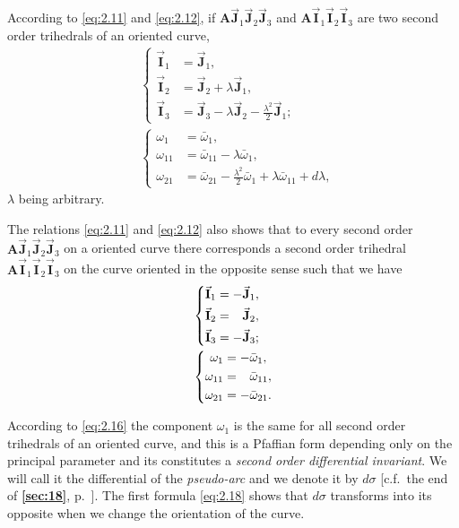 \documentclass[leqno,11pt]{book}
\numberwithin{equation}{chapter}
\theoremstyle{shape1}
\theoremstyle{shapesmall}
\newcommand{\fsref}[1]{{\rm\textsection\textbf{\ref{sec:#1}}}}
\newcommand{\rvec}[1]{\vec{\mathbf{#1}}}
\newcommand{\ivec}{\rvec{I}}
\newcommand{\jvec}{\rvec{J}}
\begin{document}
According to \eqref{eq:2.11} and \eqref{eq:2.12}, if $\mathbf{A}\jvec_{1}\jvec_{2}\jvec_{3}$ and $\mathbf{A}\ivec_{1}\ivec_{2}\ivec_{3}$ are two second order trihedrals of an oriented curve,
\begin{align}
  \label{eq:2.15}
  &\left\{
    \begin{aligned}
      \ivec_{1}&=\jvec_{1},\\
      \ivec_{2}&=\jvec_{2}+\lambda\jvec_{1},\\
      \ivec_{3}&=\jvec_{3}-\lambda\jvec_{2}-\frac{\lambda^{2}}{2}\jvec_{1};
    \end{aligned}
  \right.
\\
  \label{eq:2.16}
  &\left\{
    \begin{aligned}
      \omega_{1}&=\bar\omega_{1},\\
      \omega_{11}&=\bar\omega_{11}-\lambda\bar\omega_{1},\\
      \omega_{21}&=\bar\omega_{21}-\frac{\lambda^{2}}{2}\bar\omega_{1}+\lambda\bar\omega_{11}+d\lambda,
    \end{aligned}
  \right.
\end{align}
$\lambda$ being arbitrary.

The relations \eqref{eq:2.11} and \eqref{eq:2.12} also shows that to every second order $\mathbf{A}\jvec_{1}\jvec_{2}\jvec_{3}$ on a oriented curve there corresponds a second order trihedral $\mathbf{A}\ivec_{1}\ivec_{2}\ivec_{3}$ on the curve oriented in the opposite sense such that we have
\begin{align}
  \label{eq:2.17}
  &\left\{
    \begin{aligned}
      \ivec_{1}&=-\jvec_{1},\\
      \ivec_{2}&=\hphantom{+}\jvec_{2},\\
      \ivec_{3}&=-\jvec_{3};
    \end{aligned}
  \right.
  \\
  \label{eq:2.18}
  &\left\{
    \begin{aligned}
      \omega_{1}&=-\bar\omega_{1},\\
      \omega_{11}&=\hphantom{+}\bar\omega_{11},\\
      \omega_{21}&=-\bar\omega_{21}.
    \end{aligned}
  \right.
\end{align}

According to \eqref{eq:2.16} the component $\omega_{1}$ is the same for all second order trihedrals of an oriented curve, and this is a Pfaffian form depending only on the principal parameter and its constitutes a \emph{second order differential invariant}. We will call it the differential of the \emph{pseudo-arc} and we denote it by $d\sigma$ [c.f.~the end of \fsref{18}, p.~\pageref{sec:18}]. The first formula \eqref{eq:2.18} shows that $d\sigma$ transforms into its opposite when we change the orientation of the curve.
\end{document}
